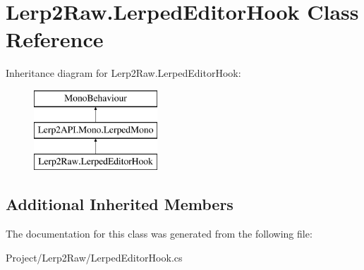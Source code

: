 \hypertarget{class_lerp2_raw_1_1_lerped_editor_hook}{}\section{Lerp2\+Raw.\+Lerped\+Editor\+Hook Class Reference}
\label{class_lerp2_raw_1_1_lerped_editor_hook}
Inheritance diagram for Lerp2\+Raw.\+Lerped\+Editor\+Hook\+:\begin{figure}[H]
\begin{center}
\leavevmode
\includegraphics[height=3.000000cm]{class_lerp2_raw_1_1_lerped_editor_hook}
\end{center}
\end{figure}
\subsection*{Additional Inherited Members}


The documentation for this class was generated from the following file\+:\begin{DoxyCompactItemize}
\item 
Project/\+Lerp2\+Raw/Lerped\+Editor\+Hook.\+cs\end{DoxyCompactItemize}

